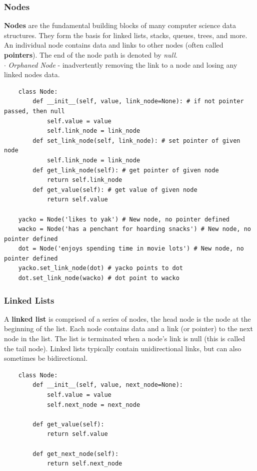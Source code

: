 \documentclass[11pt, a4paper]{article}
\begin{document}
\begin{spacing}{1.1}
	\subsubsection{Nodes}
	\textbf{Nodes} are the fundamental building blocks of many computer science data structures. They form the basis for linked lists, stacks, queues, trees, and more. An individual node contains data and links to other nodes (often called \textbf{pointers}). The end of the node path is denoted by \textit{null}. \\
	\hspace*{1.5mm} $\cdot$ \textit{Orphaned Node} - inadvertently removing the link to a node and losing any linked nodes data.
	\begin{lstlisting}
	class Node:
		def __init__(self, value, link_node=None): # if not pointer passed, then null
			self.value = value
			self.link_node = link_node	
		def set_link_node(self, link_node): # set pointer of given node
			self.link_node = link_node	
		def get_link_node(self): # get pointer of given node
			return self.link_node	
		def get_value(self): # get value of given node
			return self.value 
	
	yacko = Node('likes to yak') # New node, no pointer defined
	wacko = Node('has a penchant for hoarding snacks') # New node, no pointer defined
	dot = Node('enjoys spending time in movie lots') # New node, no pointer defined
	yacko.set_link_node(dot) # yacko points to dot
	dot.set_link_node(wacko) # dot point to wacko \end{lstlisting} \newpage
	
	\subsubsection{Linked Lists} 
	A \textbf{linked list} is comprised of a series of nodes, the head node is the node at the beginning of the list. Each node contains data and a link (or pointer) to the next node in the list. The list is terminated when a node’s link is null (this is called the tail node). Linked lists typically contain unidirectional links, but can also sometimes be bidirectional. 
	\begin{lstlisting}
	class Node:
		def __init__(self, value, next_node=None):
			self.value = value
			self.next_node = next_node
		
		def get_value(self):
			return self.value
		
		def get_next_node(self):
			return self.next_node
		

\end{lstlisting}
\end{spacing}
\end{document}

